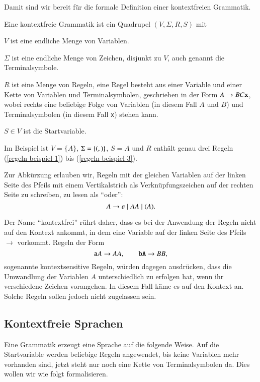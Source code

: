 Damit sind wir bereit für die formale Definition einer kontextfreien
Grammatik.
\begin{definition}
%
Eine kontextfreie Grammatik ist ein Quadrupel $(V,\Sigma,R,S)$ mit
\begin{compactenum}
%
\item $V$ ist eine endliche Menge von Variablen.
%
\item $\Sigma$ ist eine endliche Menge von Zeichen, disjunkt zu $V$,
auch genannt die Terminalsymbole.
\item $R$ ist eine Menge von Regeln, eine Regel besteht aus einer
Variable und einer Kette von Variablen und Terminalsymbolen, geschrieben
in der Form $A\to BC{\tt x}$, wobei rechts eine beliebige Folge von
Variablen (in diesem Fall $A$ und $B$) und Terminalsymbolen (in diesem Fall
\texttt{x}) stehen kann.
%
\item $S\in V$ ist die Startvariable.
%
\end{compactenum}
\end{definition}
Im Beispiel ist $V=\{A\}$, $\Sigma=\{{\tt (},{\tt )}\}$, $S=A$ und
$R$ enthält genau drei Regeln (\ref{regeln-beispiel-1}) bis
(\ref{regeln-beispiel-3}).

Zur Abkürzung erlauben wir, Regeln mit der gleichen Variablen
auf der linken Seite des Pfeils mit einem Vertikalstrich als
Verknüpfungszeichen auf der rechten Seite zu schreiben, zu lesen
als ``oder'':
\[
A \to \varepsilon\;|\; AA\;|\; {\tt (}A{\tt )}.
\]

Der Name ``kontextfrei'' rührt daher, dass es bei der Anwendung
der Regeln nicht auf den Kontext ankommt, in dem eine Variable
auf der linken Seite des Pfeils~$\rightarrow$ vorkommt. Regeln der
Form 
\[
{\tt a}A\to AA, \qquad {\tt bA}\to BB,
\]
sogenannte kontextsensitive Regeln,
%
würden dagegen ausdrücken, dass die Umwandlung der Variablen $A$
unterschiedlich zu erfolgen hat, wenn ihr verschiedene Zeichen
vorangehen. In diesem Fall käme es auf den Kontext an. Solche
Regeln sollen jedoch nicht zugelassen sein.

\subsection{Kontextfreie Sprachen}
Eine Grammatik erzeugt eine Sprache auf die folgende Weise.
Auf die Startvariable werden beliebige Regeln angewendet,
bis keine Variablen mehr vorhanden sind, jetzt steht nur noch
eine Kette von Terminalsymbolen da. Dies wollen wir wie folgt
formalisieren.

